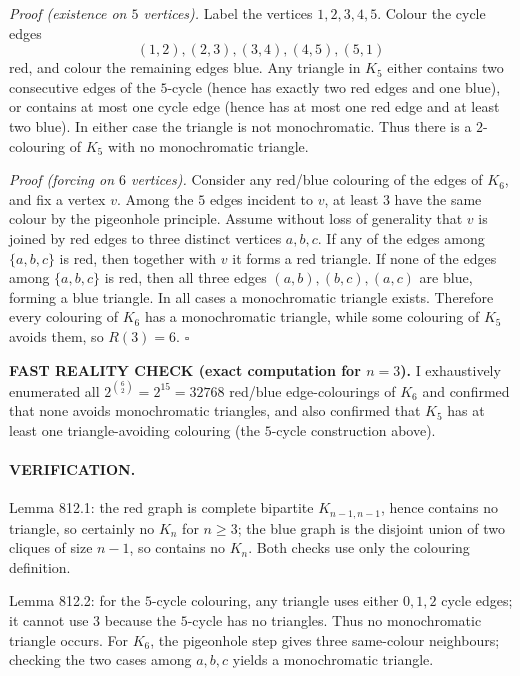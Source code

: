 \emph{Proof (existence on $5$ vertices).}
Label the vertices $1,2,3,4,5$. Colour the cycle edges
\[(1,2),(2,3),(3,4),(4,5),(5,1)
\]
red, and colour the remaining edges blue.
Any triangle in $K_5$ either contains two consecutive edges of the $5$-cycle (hence has exactly two red edges and one blue), or contains at most one cycle edge (hence has at most one red edge and at least two blue). In either case the triangle is not monochromatic.
Thus there is a $2$-colouring of $K_5$ with no monochromatic triangle.

\emph{Proof (forcing on $6$ vertices).}
Consider any red/blue colouring of the edges of $K_6$, and fix a vertex $v$.
Among the $5$ edges incident to $v$, at least $3$ have the same colour by the pigeonhole principle.
Assume without loss of generality that $v$ is joined by red edges to three distinct vertices $a,b,c$.
If any of the edges among $\{a,b,c\}$ is red, then together with $v$ it forms a red triangle.
If none of the edges among $\{a,b,c\}$ is red, then all three edges $(a,b),(b,c),(a,c)$ are blue, forming a blue triangle.
In all cases a monochromatic triangle exists.
Therefore every colouring of $K_6$ has a monochromatic triangle, while some colouring of $K_5$ avoids them, so $R(3)=6$.
\hfill $\square$

\textbf{FAST REALITY CHECK (exact computation for $n=3$).}
I exhaustively enumerated all $2^{\binom{6}{2}}=2^{15}=32768$ red/blue edge-colourings of $K_6$ and confirmed that none avoids monochromatic triangles, and also confirmed that $K_5$ has at least one triangle-avoiding colouring (the $5$-cycle construction above).

\paragraph{VERIFICATION.}
Lemma 812.1: the red graph is complete bipartite $K_{n-1,n-1}$, hence contains no triangle, so certainly no $K_n$ for $n\ge3$; the blue graph is the disjoint union of two cliques of size $n-1$, so contains no $K_n$. Both checks use only the colouring definition.

Lemma 812.2: for the $5$-cycle colouring, any triangle uses either $0,1,2$ cycle edges; it cannot use $3$ because the $5$-cycle has no triangles. Thus no monochromatic triangle occurs. For $K_6$, the pigeonhole step gives three same-colour neighbours; checking the two cases among $a,b,c$ yields a monochromatic triangle.

